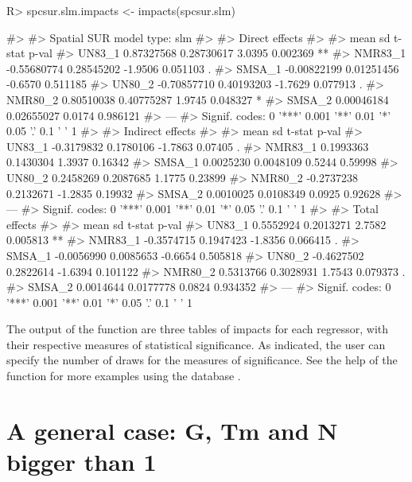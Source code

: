 \documentclass[article]{jss}
\begin{document}
\begin{CodeChunk}

\begin{CodeInput}
R> spcsur.slm.impacts <- impacts(spcsur.slm)
\end{CodeInput}

\begin{CodeOutput}
#> 
#> Spatial SUR model type:  slm 
#> 
#>  Direct effects 
#> 
#>                mean          sd  t-stat    p-val   
#> UN83_1   0.87327568  0.28730617  3.0395 0.002369 **
#> NMR83_1 -0.55680774  0.28545202 -1.9506 0.051103 . 
#> SMSA_1  -0.00822199  0.01251456 -0.6570 0.511185   
#> UN80_2  -0.70857710  0.40193203 -1.7629 0.077913 . 
#> NMR80_2  0.80510038  0.40775287  1.9745 0.048327 * 
#> SMSA_2   0.00046184  0.02655027  0.0174 0.986121   
#> ---
#> Signif. codes:  0 '***' 0.001 '**' 0.01 '*' 0.05 '.' 0.1 ' ' 1
#> 
#>  Indirect effects 
#> 
#>               mean         sd  t-stat   p-val  
#> UN83_1  -0.3179832  0.1780106 -1.7863 0.07405 .
#> NMR83_1  0.1993363  0.1430304  1.3937 0.16342  
#> SMSA_1   0.0025230  0.0048109  0.5244 0.59998  
#> UN80_2   0.2458269  0.2087685  1.1775 0.23899  
#> NMR80_2 -0.2737238  0.2132671 -1.2835 0.19932  
#> SMSA_2   0.0010025  0.0108349  0.0925 0.92628  
#> ---
#> Signif. codes:  0 '***' 0.001 '**' 0.01 '*' 0.05 '.' 0.1 ' ' 1
#> 
#>  Total effects 
#> 
#>               mean         sd  t-stat    p-val   
#> UN83_1   0.5552924  0.2013271  2.7582 0.005813 **
#> NMR83_1 -0.3574715  0.1947423 -1.8356 0.066415 . 
#> SMSA_1  -0.0056990  0.0085653 -0.6654 0.505818   
#> UN80_2  -0.4627502  0.2822614 -1.6394 0.101122   
#> NMR80_2  0.5313766  0.3028931  1.7543 0.079373 . 
#> SMSA_2   0.0014644  0.0177778  0.0824 0.934352   
#> ---
#> Signif. codes:  0 '***' 0.001 '**' 0.01 '*' 0.05 '.' 0.1 ' ' 1
\end{CodeOutput}
\end{CodeChunk}

The output of the function are three tables of impacts for each regressor, with their respective measures of statistical significance. As indicated, the user can specify the number of draws for the measures of significance. See the help of the function for more examples using the database .

\hypertarget{general-case}{%
\section{A general case: G, Tm and N bigger than 1}\label{general-case}}
\end{document}
